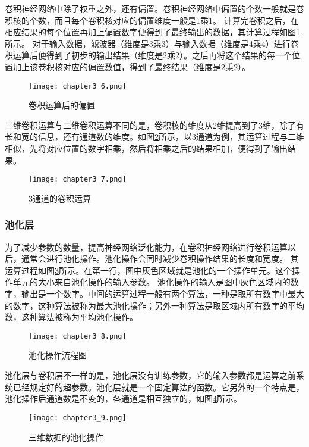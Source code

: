 卷积神经网络中除了权重之外，还有偏置。卷积神经网络中偏置的个数一般就是卷积核的个数，而且每个卷积核对应的偏置维度一般是1乘1。
计算完卷积之后，在相应结果的每个位置再加上偏置数字便得到了最终输出的数据，其计算过程如图\ref{fig:chapter3_6}所示。
对于输入数据，滤波器（维度是3乘3）与输入数据（维度是4乘4）进行卷积运算后便得到了初步的输出结果（维度是2乘2）。之后再将这个结果的每一个位置加上该卷积核对应的偏置数值，得到了最终结果（维度是2乘2）。
\begin{figure}
    \centering
    \texttt{[image: chapter3\_6.png]}
    \caption{卷积运算后的偏置\cite{luyujie_216}}
    \label{fig:chapter3_6}
\end{figure}

三维卷积运算与二维卷积运算不同的是，卷积核的维度从2维提高到了3维，除了有长和宽的信息，还有通道数的维度。如图\ref{fig:chapter3_7}所示，以3通道为例，其运算过程与二维相似，先将对应位置的数字相乘，然后将相乘之后的结果相加，便得到了输出结果。
\begin{figure}
    \centering
    \texttt{[image: chapter3\_7.png]}
    \caption{3通道的卷积运算\cite{luyujie_216}}
    \label{fig:chapter3_7}
\end{figure}
\subsubsection{池化层}
为了减少参数的数量，提高神经网络泛化能力，在卷积神经网络进行卷积运算以后，通常会进行池化操作。池化操作会同时减少卷积操作结果的长度和宽度。
其运算过程如图\ref{fig:chapter3_8}所示。在第一行，图中灰色区域就是池化的一个操作单元。这个操作单元的大小来自池化操作的输入参数。
池化操作的输入是图中灰色区域内的数字，输出是一个数字。中间的运算过程一般有两个算法，一种是取所有数字中最大的数字，这种算法被称为最大池化操作；另外一种算法是取区域内所有数字的平均数，这种算法被称为平均池化操作。
\begin{figure}
    \centering
    \texttt{[image: chapter3\_8.png]}
    \caption{池化操作流程图\cite{luyujie_216}}
    \label{fig:chapter3_8}
\end{figure}

池化层与卷积层不一样的是，池化层没有训练参数，它的输入参数都是运算之前系统已经规定好的超参数。池化层就是一个固定算法的函数。它另外的一个特点是，池化操作后通道数是不变的，各通道是相互独立的，如图\ref{fig:chapter3_9}所示。
\begin{figure}
    \centering
    \texttt{[image: chapter3\_9.png]}
    \caption{三维数据的池化操作\cite{luyujie_216}}
    \label{fig:chapter3_9}
\end{figure}

